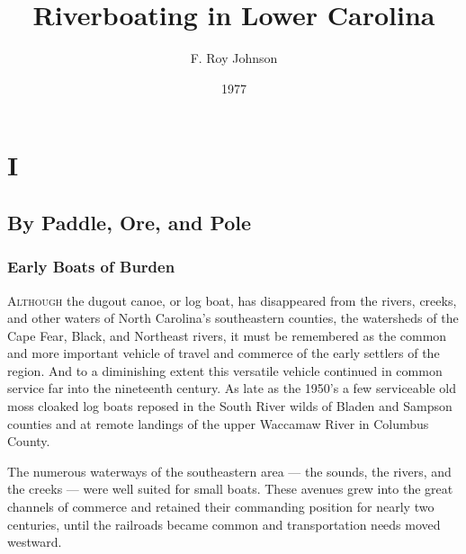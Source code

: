 \documentclass[11pt, a5paper, openright]{book}
\begin{document}
\renewcommand{\thechapter}{\Roman{chapter}}
\title{Riverboating in Lower Carolina}
\author{F. Roy Johnson}
\date{1977}

\maketitle



\part{I}

\chapter{By Paddle, Ore, and Pole}

\section{Early Boats of Burden}

\textsc{Although} the dugout canoe, or log boat, has disappeared from
the rivers, creeks, and other waters of North Carolina's southeastern
counties, the watersheds of the Cape Fear, Black, and Northeast
rivers, it must be remembered as the common and more important vehicle
of travel and commerce of the early settlers of the region.  And to a
diminishing extent this versatile vehicle continued in common service
far into the nineteenth century.  As late as the 1950's a few
serviceable old moss cloaked log boats reposed in the South River
wilds of Bladen and Sampson counties and at remote landings of the
upper Waccamaw River in Columbus County.\par

The numerous waterways of the southeastern area --- the sounds, the
rivers, and the creeks --- were well suited for small boats.  These
avenues grew into the great channels of commerce and retained their
commanding position for nearly two centuries, until the railroads
became common and transportation needs moved westward.\par
\end{document}
